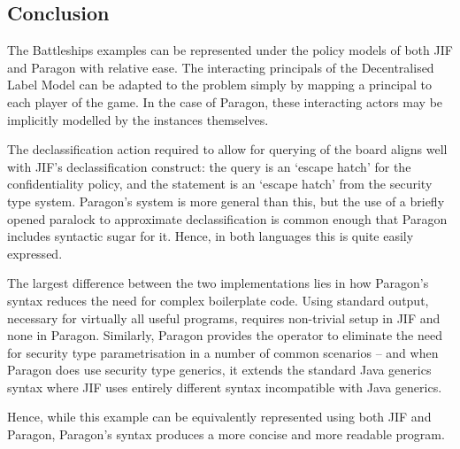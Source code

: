 \subsection{Conclusion}

The Battleships examples can be represented under the policy models of both JIF and Paragon with relative ease. The interacting principals of the Decentralised Label Model can be adapted to the problem simply by mapping a principal to each player of the game. In the case of Paragon, these interacting actors may be implicitly modelled by the  instances themselves.

The declassification action required to allow for querying of the board aligns well with JIF's declassification construct: the query is an `escape hatch' for the confidentiality policy, and the  statement is an `escape hatch' from the security type system. Paragon's system is more general than this, but the use of a briefly opened paralock to approximate declassification is common enough that Paragon includes syntactic sugar for it. Hence, in both languages this is quite easily expressed.

The largest difference between the two implementations lies in how Paragon's syntax reduces the need for complex boilerplate code. Using standard output, necessary for virtually all useful programs, requires non-trivial setup in JIF and none in Paragon. Similarly, Paragon provides the  operator to eliminate the need for security type parametrisation in a number of common scenarios -- and when Paragon does use security type generics, it extends the standard Java generics syntax where JIF uses entirely different syntax incompatible with Java generics.

Hence, while this example can be equivalently represented using both JIF and Paragon, Paragon's syntax produces a more concise and more readable program.